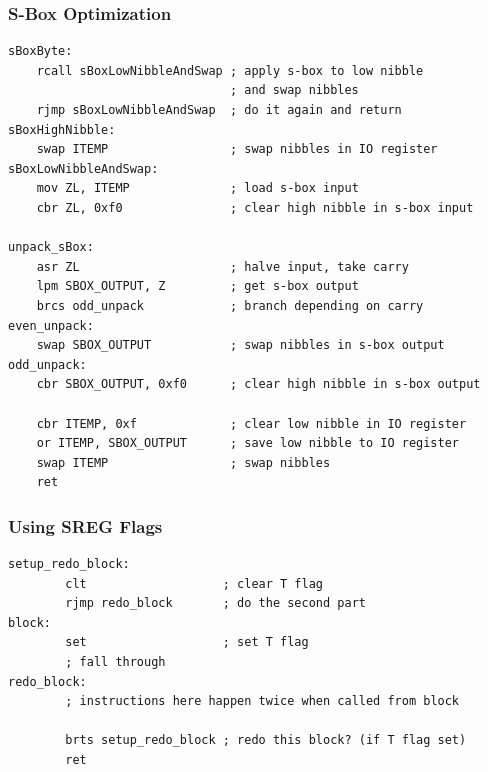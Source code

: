 \documentclass{beamer}
\begin{document}
\begin{frame}[fragile]
\frametitle{S-Box Optimization}
\begin{lstlisting}
sBoxByte:
    rcall sBoxLowNibbleAndSwap ; apply s-box to low nibble
                               ; and swap nibbles
    rjmp sBoxLowNibbleAndSwap  ; do it again and return
sBoxHighNibble:
    swap ITEMP                 ; swap nibbles in IO register
sBoxLowNibbleAndSwap:
    mov ZL, ITEMP              ; load s-box input
    cbr ZL, 0xf0               ; clear high nibble in s-box input

unpack_sBox:
    asr ZL                     ; halve input, take carry
    lpm SBOX_OUTPUT, Z         ; get s-box output
    brcs odd_unpack            ; branch depending on carry
even_unpack:
    swap SBOX_OUTPUT           ; swap nibbles in s-box output
odd_unpack:
    cbr SBOX_OUTPUT, 0xf0      ; clear high nibble in s-box output

    cbr ITEMP, 0xf             ; clear low nibble in IO register
    or ITEMP, SBOX_OUTPUT      ; save low nibble to IO register
    swap ITEMP                 ; swap nibbles
    ret
\end{lstlisting}
\end{frame}


%

\begin{frame}[fragile]
\frametitle{Using SREG Flags}
\begin{lstlisting}
setup_redo_block:
        clt                   ; clear T flag
        rjmp redo_block       ; do the second part
block:
        set                   ; set T flag
        ; fall through
redo_block:
        ; instructions here happen twice when called from block

        brts setup_redo_block ; redo this block? (if T flag set)
        ret
\end{lstlisting}
\end{frame}
\end{document}
